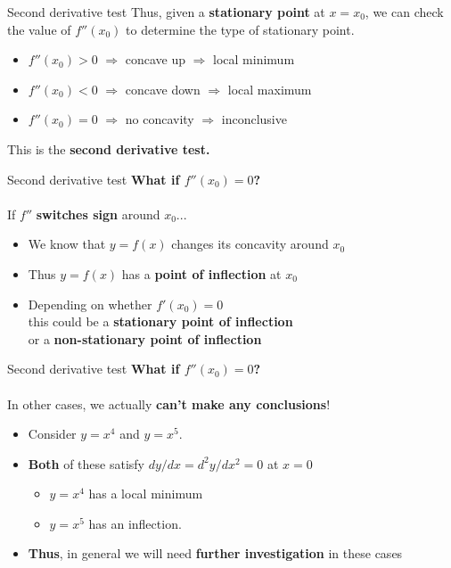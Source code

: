 \documentclass{beamer}
\begin{document}
\begin{frame}{Second derivative test}
	Thus, given a \textbf{stationary point} at $x = x_0$, we can check the value of $f''(x_0)$ to determine the type of stationary point.
		
	\begin{itemize}
		\item $f''(x_0) > 0$ $\Rightarrow$ concave up $\Rightarrow$ local minimum
		\item $f''(x_0) < 0$ $\Rightarrow$ concave down $\Rightarrow$ local maximum
		\item $f''(x_0) = 0$ $\Rightarrow$ no concavity $\Rightarrow$ inconclusive
	\end{itemize}
	
	This is the \textbf{second derivative test.}
\end{frame}


\begin{frame}{Second derivative test}
	\textbf{What if $f''(x_0) = 0$?}
	\\~\\
	If $f''$ \textbf{switches sign} around $x_0$...
	\begin{itemize}
		\item We know that $y = f(x)$ changes its concavity around $x_0$
		\item Thus $y = f(x)$ has a \textbf{point of inflection} at $x_0$
		\item Depending on whether $f'(x_0) = 0$\\	this could be a \textbf{stationary point of inflection}\\or a \textbf{non-stationary point of inflection}
	\end{itemize}
\end{frame}

\begin{frame}{Second derivative test}
	\textbf{What if $f''(x_0) = 0$?}
	\\~\\
	In other cases, we actually \textbf{can't make any conclusions}!
	\begin{itemize}
		\item Consider $y = x^4$ and $y = x^5$.
		\item \textbf{Both} of these satisfy $dy/dx = d^2y/dx^2 = 0$ at $x = 0$
		\begin{itemize}
			\item $y = x^4$ has a local minimum
			\item $y = x^5$ has an inflection.
			
		\end{itemize}
		\item \textbf{Thus}, in general we will need \textbf{further investigation} in these cases
	\end{itemize}	
\end{frame}
\end{document}
